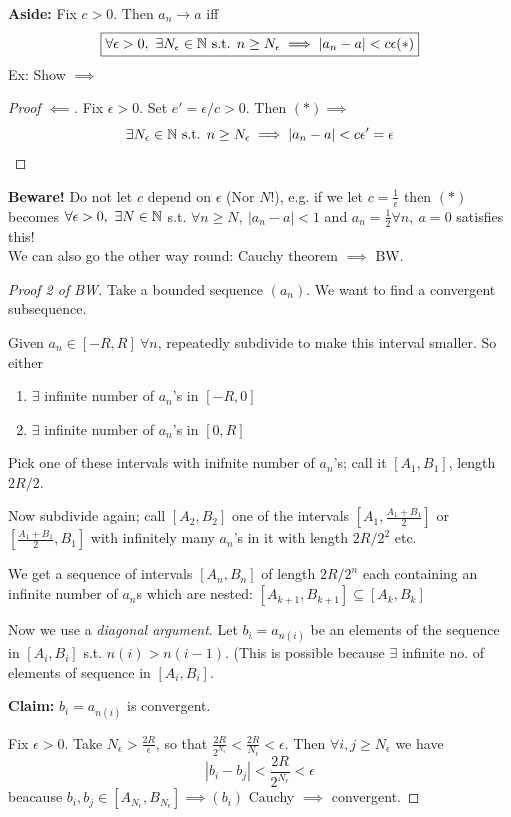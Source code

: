\documentclass[twoside]{scrartcl}
\begin{document}
\textbf{Aside:} Fix $c >0$. Then $a_n \to a$ iff 
\[\boxed{\forall \epsilon >0,~\exists N_{\epsilon} \in\mathbb{N} \text{ s.t. } n \geq N_\epsilon \implies |a_n - a| < c\epsilon (*)}\]
Ex: Show $\implies$

\begin{proof}[Proof $\impliedby$] Fix $\epsilon >0$. Set $e' = \epsilon/c >0$. Then $(*) \implies $
\[\exists N_\epsilon \in\mathbb{N} \text{ s.t. } n \geq N_\epsilon \implies |a_n - a| < c\epsilon' = \epsilon\qedhere\]
\end{proof}

\textbf{Beware!} Do not let $c$ depend on $\epsilon$ (Nor $N!$), e.g. if we let $c = \frac{1}{\epsilon}$ then $(*)$ becomes $\forall \epsilon >0,~\exists N \in\mathbb{N}$ s.t. $\forall n \geq N,~|a_n - a| < 1$ and $a_n = \frac{1}{2} \forall n,~ a = 0$ satisfies this!\\

We can also go the other way round: Cauchy theorem $\implies$ BW. 

\begin{proof}[Proof 2 of BW]



Take a bounded sequence $(a_n)$. We want to find a convergent subsequence. 

Given $a_n \in [-R,R]~ \forall n$, repeatedly subdivide to make this interval smaller. So either
\begin{enumerate}
\item $\exists$ infinite number of $a_n$'s in $[-R,0]$
\item $\exists$ infinite number of $a_n$'s in $[0,R]$
\end{enumerate}

Pick one of these intervals with inifnite number of $a_n$'s; call it $[A_1,B_1]$, length $2R/2$. 

Now subdivide again; call $[A_2,B_2]$ one of the intervals $[A_1,\frac{A_1+B_1}{2}]$ or $[\frac{A_1+B_1}{2},B_1]$ with infinitely many $a_n$'s in it with length $2R/2^2$ etc. 

We get a sequence of intervals $[A_n,B_n]$ of length $2R/2^n$ each containing an infinite number of $a_n$s which are nested: $[A_{k+1},B_{k+1}] \subseteq [A_k,B_k]$


Now we use a \emph{diagonal argument}. Let $b_i = a_{n(i)}$ be an elements of the sequence in $[A_i,B_i]$ s.t. $n(i) > n(i-1)$. (This is possible because $\exists$ infinite no. of elements of sequence in $[A_i,B_i]$. 

 \textbf{Claim:} $b_i = a_{n(i)}$ is convergent.

Fix $\epsilon >0$. Take $N_{\epsilon} > \frac{2R}{\epsilon}$, so that $\frac{2R}{2^{N_{\epsilon}}} < \frac{2R}{N_{\epsilon}} < \epsilon$. Then $\forall i, j \geq N_{\epsilon}$ we have
\[|b_i - b_j| < \frac{2R}{2^{N_{\epsilon}}} < \epsilon\]
beacause $b_i,b_j \in [A_{N_{\epsilon}},B_{N_{\epsilon}}] \implies (b_i)$ Cauchy $\implies$ convergent.
	\end{proof}\vspace*{5pt}
	
\end{document}
